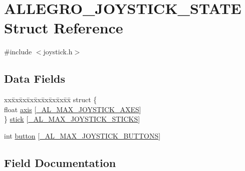 \hypertarget{struct_a_l_l_e_g_r_o___j_o_y_s_t_i_c_k___s_t_a_t_e}{}\section{A\+L\+L\+E\+G\+R\+O\+\_\+\+J\+O\+Y\+S\+T\+I\+C\+K\+\_\+\+S\+T\+A\+TE Struct Reference}
\label{struct_a_l_l_e_g_r_o___j_o_y_s_t_i_c_k___s_t_a_t_e}


{\ttfamily \#include $<$joystick.\+h$>$}

\subsection*{Data Fields}
\begin{DoxyCompactItemize}
\item 
\begin{tabbing}
xx\=xx\=xx\=xx\=xx\=xx\=xx\=xx\=xx\=\kill
struct \{\\
\>float \hyperlink{struct_a_l_l_e_g_r_o___j_o_y_s_t_i_c_k___s_t_a_t_e_a2ef8a0e661443a400ebbc88722640487}{axis} \mbox{[}\hyperlink{joystick_8h_aa88de1a14977a56ee394438de471afa8}{\_AL\_MAX\_JOYSTICK\_AXES}\mbox{]}\\
\} \hyperlink{struct_a_l_l_e_g_r_o___j_o_y_s_t_i_c_k___s_t_a_t_e_ab3c4b58243f50b4e6ce57354d042112e}{stick} \mbox{[}\hyperlink{joystick_8h_a9788d17f24105eed110c0db83b7ad76d}{\_AL\_MAX\_JOYSTICK\_STICKS}\mbox{]}\\

\end{tabbing}\item 
int \hyperlink{struct_a_l_l_e_g_r_o___j_o_y_s_t_i_c_k___s_t_a_t_e_a34eb15502af5d6988743a414e5b6c333}{button} \mbox{[}\hyperlink{joystick_8h_a13097ab2382a03398bff5af779ef56eb}{\+\_\+\+A\+L\+\_\+\+M\+A\+X\+\_\+\+J\+O\+Y\+S\+T\+I\+C\+K\+\_\+\+B\+U\+T\+T\+O\+NS}\mbox{]}
\end{DoxyCompactItemize}


\subsection{Field Documentation}
\mbox{\label{struct_a_l_l_e_g_r_o___j_o_y_s_t_i_c_k___s_t_a_t_e_a2ef8a0e661443a400ebbc88722640487}} 
